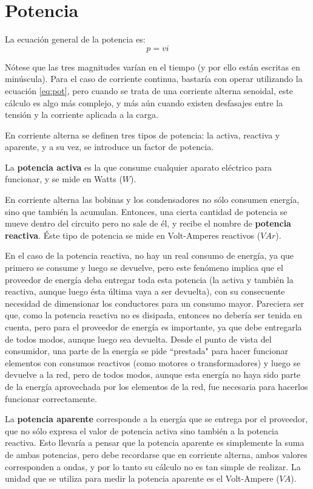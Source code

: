 \section{Potencia}

La ecuación general de la potencia es: $$ p = vi $$

Nótese que las tres magnitudes varían en el tiempo (y por ello están escritas en minúscula). Para el caso de corriente continua, bastaría con operar utilizando la ecuación  \ref{eq:pot}, pero cuando se trata de una corriente alterna senoidal, este cálculo es algo más complejo, y más aún cuando existen desfasajes entre la tensión y la corriente aplicada a la carga.

En corriente alterna se definen tres tipos de potencia: la activa, reactiva y aparente, y a su vez, se introduce un factor de potencia.

La \textbf{potencia activa} es la que consume cualquier aparato eléctrico para funcionar, y se mide en Watts ($W$).

En corriente alterna las bobinas y los condensadores no sólo consumen energía, sino que también la acumulan. Entonces, una cierta cantidad de potencia se mueve dentro del circuito pero no sale de él, y recibe el nombre de \textbf{potencia reactiva}. Éste tipo de potencia se mide en Volt-Amperes reactivos ($VAr$).

En el caso de la potencia reactiva, no hay un real consumo de energía, ya que primero se consume y luego se devuelve, pero este fenómeno implica que el proveedor de energía deba entregar toda esta potencia (la activa y también la reactiva, aunque luego ésta última vaya a ser devuelta), con su consecuente necesidad de dimensionar los conductores para un consumo mayor. Pareciera ser que, como la potencia reactiva no es disipada, entonces no  debería ser tenida en cuenta, pero para el proveedor de energía es importante, ya que debe entregarla de todos modos, aunque luego sea devuelta. Desde el punto de vista del consumidor, una parte de la energía se pide ``prestada" para hacer funcionar elementos con consumos reactivos (como motores o transformadores) y luego se devuelve a la red, pero de todos modos, aunque esta energía no haya sido parte de la energía aprovechada por los elementos de la red, fue necesaria para hacerlos funcionar correctamente.

La \textbf{potencia aparente} corresponde a la energía que se entrega por el proveedor, que no sólo expresa el valor de potencia activa sino también a la potencia reactiva. Esto llevaría a pensar que la potencia aparente es simplemente la suma de ambas potencias, pero debe recordarse que en corriente alterna, ambos valores corresponden a ondas, y por lo tanto su cálculo no es tan simple de realizar. La unidad que se utiliza para medir la potencia aparente es el Volt-Ampere ($VA$).

